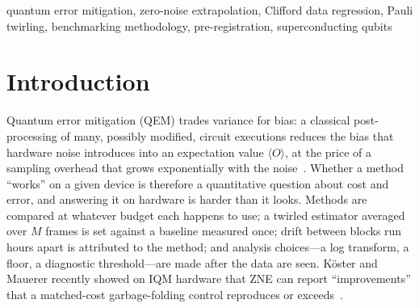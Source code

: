 \documentclass[conference]{IEEEtran}
\newcommand{\ev}[1]{\langle #1\rangle}
\begin{document}
\begin{IEEEkeywords}
quantum error mitigation, zero-noise extrapolation, Clifford data regression, Pauli
twirling, benchmarking methodology, pre-registration, superconducting qubits
\end{IEEEkeywords}

\section{Introduction}

Quantum error mitigation (QEM) trades variance for bias: a classical post-processing of
many, possibly modified, circuit executions reduces the bias that hardware noise introduces
into an expectation value $\ev{O}$, at the price of a sampling overhead that grows
exponentially with the noise~\cite{temme2017,li2017,cai2023,takagi2022,quek2024}. Whether a
method ``works'' on a given device is therefore a quantitative question about cost and
error, and answering it on hardware is harder than it looks. Methods are compared at
whatever budget each happens to use; a twirled estimator averaged over $M$ frames is set
against a baseline measured once; drift between blocks run hours apart is attributed to
the method; and analysis choices---a log transform, a floor, a diagnostic threshold---are
made after the data are seen. K\"oster and Mauerer recently showed on IQM hardware that ZNE
can report ``improvements'' that a matched-cost garbage-folding control reproduces or
exceeds~\cite{koster2026}.
\end{document}
